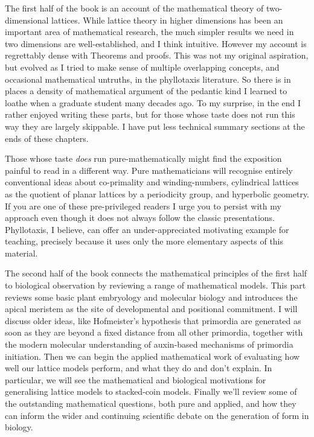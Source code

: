 The first half of the book is an account of the mathematical theory of two-dimensional lattices. While lattice theory in higher dimensions has been an important area of mathematical research, the much simpler results we need in two dimensions are well-established, and I think intuitive. However my account is regrettably dense with Theorems and proofs. This was not my original aspiration, but evolved as I tried to make sense of multiple overlapping concepts, and occasional mathematical untruths, in the phyllotaxis literature.  So there is in places a density of mathematical argument of the pedantic kind I learned to loathe when a graduate student many decades ago. To my surprise, in the end I rather enjoyed writing these parts, but for those whose taste does not run this way they are largely skippable. I have put less technical summary sections at the ends of these chapters.  

Those whose taste \textit{does} run pure-mathematically might find the exposition painful to read in a different way. Pure mathematicians will recognise entirely conventional ideas about co-primality and winding-numbers, cylindrical lattices as the quotient of planar lattices by a periodicity group, and hyperbolic geometry. If you are one of these pre-privileged readers I urge you to persist with my approach even though it does not always follow the classic presentations. Phyllotaxis, I believe, can offer an under-appreciated motivating example for teaching, precisely because it uses only the more elementary aspects of this material. 


The second half of the book connects the mathematical principles of the first half to biological observation by reviewing a range of mathematical models. This part reviews some basic plant embryology and molecular biology and introduces the apical meristem as the site of developmental and positional commitment. I will discuss older ideas, like Hofmeister's hypothesis that primordia are generated as soon as they are beyond a fixed distance from all other primordia, together with the modern molecular understanding of  auxin-based mechanisms of primordia initiation. Then we can begin the applied mathematical work of evaluating how well our lattice models perform, and what they do and don't explain. In particular, we will see the mathematical and biological motivations for generalising lattice models to stacked-coin models. Finally we'll  review some of the outstanding mathematical questions, both pure and applied, and how they can inform the wider and continuing scientific debate on the generation of form in biology.






